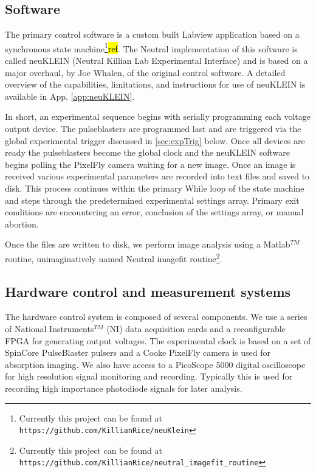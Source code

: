 \subsection{Software} \label{ssec:soft_sys}
The primary control software is a custom built Labview application based on a synchronous state machine\footnote{Currently this project can be found at \texttt{https://github.com/KillianRice/neuKlein}}\hl{ref}.
The Neutral implementation of this software is called neuKLEIN (Neutral Killian Lab Experimental Interface) and is based on a major overhaul, by Joe Whalen, of the original control software.
A detailed overview of the capabilities, limitations, and instructions for use of neuKLEIN is available in App. \ref{app:neuKLEIN}.

In short, an experimental sequence begins with serially programming each voltage output device.
The pulseblasters are programmed last and are triggered via the global experimental trigger discussed in \ref{sec:expTrig} below.
Once all devices are ready the pulseblasters become the global clock and the neuKLEIN software begins polling the PixelFly camera waiting for a new image.
Once an image is received various experimental parameters are recorded into text files and saved to disk.
This process continues within the primary While loop of the state machine and steps through the predetermined experimental settings array.
Primary exit conditions are encountering an error, conclusion of the settings array, or manual abortion.

Once the files are written to disk, we perform image analysis using a Matlab$^{TM}$ routine, unimaginatively named Neutral imagefit routine\footnote{Currently this project can be found at \texttt{https://github.com/KillianRice/neutral\_imagefit\_routine}}.

\subsection{Hardware control and measurement systems} \label{ssec:comp_sys}
The hardware control system is composed of several components.
We use a series of National Instruments$^{TM}$ (NI) data acquisition cards and a reconfigurable FPGA for generating output voltages.
The experimental clock is based on a set of SpinCore PulseBlaster pulsers and a Cooke PixelFly camera is used for absorption imaging.
We also have access to a PicoScope 5000 digital oscilloscope for high resolution signal monitoring and recording. Typically this is used for recording high importance photodiode signals for later analysis.

